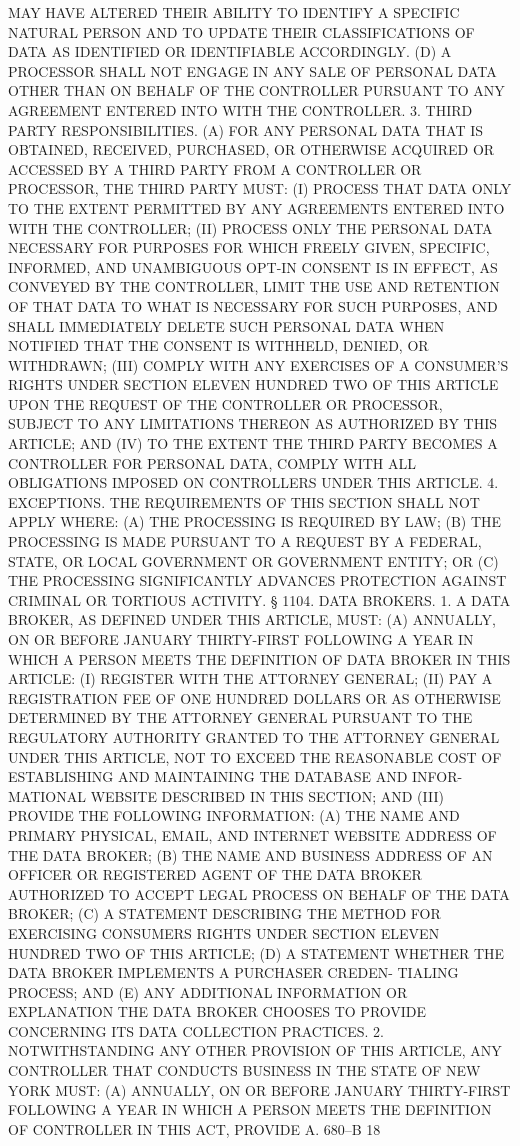  MAY HAVE ALTERED THEIR ABILITY TO IDENTIFY A SPECIFIC NATURAL PERSON AND
 TO  UPDATE  THEIR  CLASSIFICATIONS OF DATA AS IDENTIFIED OR IDENTIFIABLE
 ACCORDINGLY.
   (D)  A  PROCESSOR  SHALL NOT ENGAGE IN ANY SALE OF PERSONAL DATA OTHER
 THAN ON BEHALF OF THE CONTROLLER PURSUANT TO ANY AGREEMENT ENTERED  INTO
 WITH THE CONTROLLER.
   3.  THIRD  PARTY  RESPONSIBILITIES.  (A) FOR ANY PERSONAL DATA THAT IS
 OBTAINED, RECEIVED, PURCHASED, OR OTHERWISE ACQUIRED OR  ACCESSED  BY  A
 THIRD PARTY FROM A CONTROLLER OR PROCESSOR, THE THIRD PARTY MUST:
   (I)  PROCESS  THAT DATA ONLY TO THE EXTENT PERMITTED BY ANY AGREEMENTS
 ENTERED INTO WITH THE CONTROLLER;
   (II) PROCESS ONLY THE PERSONAL DATA NECESSARY FOR PURPOSES  FOR  WHICH
 FREELY  GIVEN,  SPECIFIC, INFORMED, AND UNAMBIGUOUS OPT-IN CONSENT IS IN
 EFFECT, AS CONVEYED BY THE CONTROLLER, LIMIT THE USE  AND  RETENTION  OF
 THAT  DATA TO WHAT IS NECESSARY FOR SUCH PURPOSES, AND SHALL IMMEDIATELY
 DELETE SUCH PERSONAL DATA WHEN NOTIFIED THAT THE  CONSENT  IS  WITHHELD,
 DENIED, OR WITHDRAWN;
   (III)  COMPLY  WITH ANY EXERCISES OF A CONSUMER'S RIGHTS UNDER SECTION
 ELEVEN HUNDRED TWO OF THIS ARTICLE UPON THE REQUEST OF THE CONTROLLER OR
 PROCESSOR, SUBJECT TO ANY LIMITATIONS  THEREON  AS  AUTHORIZED  BY  THIS
 ARTICLE; AND
   (IV)  TO  THE EXTENT THE THIRD PARTY BECOMES A CONTROLLER FOR PERSONAL
 DATA, COMPLY WITH ALL OBLIGATIONS  IMPOSED  ON  CONTROLLERS  UNDER  THIS
 ARTICLE.
   4. EXCEPTIONS. THE REQUIREMENTS OF THIS SECTION SHALL NOT APPLY WHERE:
   (A) THE PROCESSING IS REQUIRED BY LAW;
   (B)  THE PROCESSING IS MADE PURSUANT TO A REQUEST BY A FEDERAL, STATE,
 OR LOCAL GOVERNMENT OR GOVERNMENT ENTITY; OR
   (C) THE PROCESSING SIGNIFICANTLY ADVANCES PROTECTION AGAINST  CRIMINAL
 OR TORTIOUS ACTIVITY.
   § 1104. DATA BROKERS. 1. A DATA BROKER, AS DEFINED UNDER THIS ARTICLE,
 MUST:
   (A)  ANNUALLY,  ON  OR BEFORE JANUARY THIRTY-FIRST FOLLOWING A YEAR IN
 WHICH A PERSON MEETS THE DEFINITION OF DATA BROKER IN THIS ARTICLE:
   (I) REGISTER WITH THE ATTORNEY GENERAL;
   (II) PAY A REGISTRATION FEE OF ONE HUNDRED  DOLLARS  OR  AS  OTHERWISE
 DETERMINED  BY THE ATTORNEY GENERAL PURSUANT TO THE REGULATORY AUTHORITY
 GRANTED TO THE ATTORNEY GENERAL UNDER THIS ARTICLE, NOT  TO  EXCEED  THE
 REASONABLE  COST OF ESTABLISHING AND MAINTAINING THE DATABASE AND INFOR-
 MATIONAL WEBSITE DESCRIBED IN THIS SECTION; AND
   (III) PROVIDE THE FOLLOWING INFORMATION:
   (A) THE NAME AND PRIMARY PHYSICAL, EMAIL, AND INTERNET WEBSITE ADDRESS
 OF THE DATA BROKER;
   (B) THE NAME AND BUSINESS ADDRESS OF AN OFFICER OR REGISTERED AGENT OF
 THE DATA BROKER AUTHORIZED TO ACCEPT LEGAL PROCESS ON BEHALF OF THE DATA
 BROKER;
   (C) A STATEMENT DESCRIBING THE METHOD FOR EXERCISING CONSUMERS  RIGHTS
 UNDER SECTION ELEVEN HUNDRED TWO OF THIS ARTICLE;
   (D) A STATEMENT WHETHER THE DATA BROKER IMPLEMENTS A PURCHASER CREDEN-
 TIALING PROCESS; AND
   (E)  ANY ADDITIONAL INFORMATION OR EXPLANATION THE DATA BROKER CHOOSES
 TO PROVIDE CONCERNING ITS DATA COLLECTION PRACTICES.
   2. NOTWITHSTANDING ANY OTHER PROVISION OF THIS ARTICLE, ANY CONTROLLER
 THAT CONDUCTS BUSINESS IN THE STATE OF NEW YORK MUST:
   (A) ANNUALLY, ON OR BEFORE JANUARY THIRTY-FIRST FOLLOWING  A  YEAR  IN
 WHICH  A  PERSON MEETS THE DEFINITION OF CONTROLLER IN THIS ACT, PROVIDE
 A. 680--B                          18

